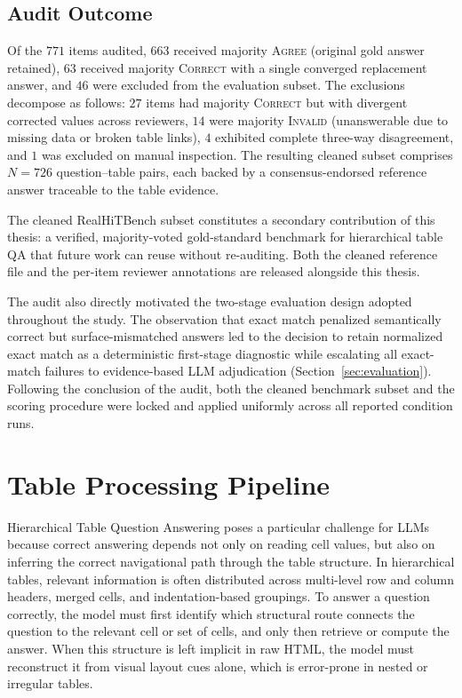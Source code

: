 ﻿\documentclass[a4paper]{article}
\begin{document}
\subsection{Audit Outcome}

Of the $771$ items audited, $663$ received majority \textsc{Agree} (original gold answer retained), $63$ received majority \textsc{Correct} with a single converged replacement answer, and $46$ were excluded from the evaluation subset. The exclusions decompose as follows: $27$ items had majority \textsc{Correct} but with divergent corrected values across reviewers, $14$ were majority \textsc{Invalid} (unanswerable due to missing data or broken table links), $4$ exhibited complete three-way disagreement, and $1$ was excluded on manual inspection. The resulting cleaned subset comprises $N = 726$ question--table pairs, each backed by a consensus-endorsed reference answer traceable to the table evidence.

The cleaned RealHiTBench subset constitutes a secondary contribution of this thesis: a verified, majority-voted gold-standard benchmark for hierarchical table QA that future work can reuse without re-auditing. Both the cleaned reference file and the per-item reviewer annotations are released alongside this thesis.

The audit also directly motivated the two-stage evaluation design adopted throughout the study. The observation that exact match penalized semantically correct but surface-mismatched answers led to the decision to retain normalized exact match as a deterministic first-stage diagnostic while escalating all exact-match failures to evidence-based LLM adjudication (Section~\ref{sec:evaluation}). Following the conclusion of the audit, both the cleaned benchmark subset and the scoring procedure were locked and applied uniformly across all reported condition runs.

\section{Table Processing Pipeline}

Hierarchical Table Question Answering poses a particular challenge for LLMs because correct answering depends not only on reading cell values, but also on inferring the correct navigational path through the table structure. In hierarchical tables, relevant information is often distributed across multi-level row and column headers, merged cells, and indentation-based groupings. To answer a question correctly, the model must first identify which structural route connects the question to the relevant cell or set of cells, and only then retrieve or compute the answer. When this structure is left implicit in raw HTML, the model must reconstruct it from visual layout cues alone, which is error-prone in nested or irregular tables.
\end{document}
